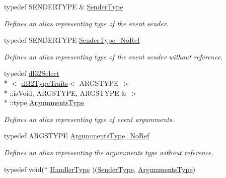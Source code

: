 \begin{DoxyCompactItemize}
\item 
\hypertarget{classdl32_event_a9117f53a76ba65e2bd3e81b4e284fc99}{typedef S\-E\-N\-D\-E\-R\-T\-Y\-P\-E \& \hyperlink{classdl32_event_a9117f53a76ba65e2bd3e81b4e284fc99}{Sender\-Type}}\label{classdl32_event_a9117f53a76ba65e2bd3e81b4e284fc99}

\begin{DoxyCompactList}\small\item\em Defines an alias representing type of the event sender. \end{DoxyCompactList}\item 
\hypertarget{classdl32_event_a26435d0d9eaecb8702b44778ebd2f766}{typedef S\-E\-N\-D\-E\-R\-T\-Y\-P\-E \hyperlink{classdl32_event_a26435d0d9eaecb8702b44778ebd2f766}{Sender\-Type\-\_\-\-No\-Ref}}\label{classdl32_event_a26435d0d9eaecb8702b44778ebd2f766}

\begin{DoxyCompactList}\small\item\em Defines an alias representing type of the event sender without reference. \end{DoxyCompactList}\item 
\hypertarget{classdl32_event_aa538fe87567988f01835e94ab65ddfaa}{typedef \hyperlink{classdl32_select}{dl32\-Select}\\*
$<$ \hyperlink{classdl32_type_traits}{dl32\-Type\-Traits}$<$ A\-R\-G\-S\-T\-Y\-P\-E $>$\\*
\-::is\-Void, A\-R\-G\-S\-T\-Y\-P\-E, A\-R\-G\-S\-T\-Y\-P\-E \& $>$\\*
\-::type \hyperlink{classdl32_event_aa538fe87567988f01835e94ab65ddfaa}{Argumments\-Type}}\label{classdl32_event_aa538fe87567988f01835e94ab65ddfaa}

\begin{DoxyCompactList}\small\item\em Defines an alias representing type of event argumments. \end{DoxyCompactList}\item 
\hypertarget{classdl32_event_acfe0f352d4d5797e1d6371ea326bfcc3}{typedef A\-R\-G\-S\-T\-Y\-P\-E \hyperlink{classdl32_event_acfe0f352d4d5797e1d6371ea326bfcc3}{Argumments\-Type\-\_\-\-No\-Ref}}\label{classdl32_event_acfe0f352d4d5797e1d6371ea326bfcc3}

\begin{DoxyCompactList}\small\item\em Defines an alias representing the argumments type without reference. \end{DoxyCompactList}\item 
\hypertarget{classdl32_event_a38bb65a0ecb861ef8cf99cc22bf2b393}{typedef void($\ast$ \hyperlink{classdl32_event_a38bb65a0ecb861ef8cf99cc22bf2b393}{Handler\-Type} )(\hyperlink{classdl32_event_a9117f53a76ba65e2bd3e81b4e284fc99}{Sender\-Type}, \hyperlink{classdl32_event_aa538fe87567988f01835e94ab65ddfaa}{Argumments\-Type})}\label{classdl32_event_a38bb65a0ecb861ef8cf99cc22bf2b393}


\end{DoxyCompactItemize}

